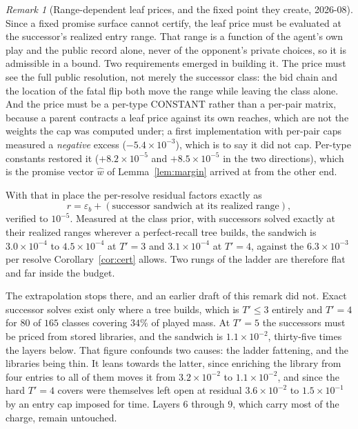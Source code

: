 \documentclass[11pt]{article}
\theoremstyle{plain}
\theoremstyle{definition}
\theoremstyle{remark}
\newtheorem{remark}[theorem]{Remark}
\begin{document}
\begin{remark}[Range-dependent leaf prices, and the fixed point they
create, 2026-08]\label{rem:fixedpoint}
Since a fixed promise surface cannot certify, the leaf price must be
evaluated at the successor's realized entry range. That range is a
function of the agent's own play and the public record alone, never of
the opponent's private choices, so it is admissible in a bound. Two
requirements emerged in building it. The price must see the full public
resolution, not merely the successor class: the bid chain and the
location of the fatal flip both move the range while leaving the class
alone. And the price must be a per-type CONSTANT rather than a per-pair
matrix, because a parent contracts a leaf price against its own reaches,
which are not the weights the cap was computed under; a first
implementation with per-pair caps measured a \emph{negative} excess
($-5.4\times10^{-3}$), which is to say it did not cap. Per-type
constants restored it ($+8.2\times10^{-5}$ and $+8.5\times10^{-5}$ in
the two directions), which is the promise vector $\hat w$ of
Lemma~\ref{lem:margin} arrived at from the other end.

With that in place the per-resolve residual factors exactly as
\[
  r = \varepsilon_b + (\text{successor sandwich at its realized range}),
\]
verified to $10^{-5}$. Measured at the class prior, with successors
solved exactly at their realized ranges wherever a perfect-recall tree
builds, the sandwich is $3.0\times10^{-4}$ to $4.5\times10^{-4}$ at
$T'{=}3$ and $3.1\times10^{-4}$ at $T'{=}4$, against the
$6.3\times10^{-3}$ per resolve Corollary~\ref{cor:cert} allows. Two
rungs of the ladder are therefore flat and far inside the budget.

The extrapolation stops there, and an earlier draft of this remark did
not. Exact successor solves exist only where a tree builds, which is
$T'\le3$ entirely and $T'{=}4$ for $80$ of $165$ classes covering $34\%$
of played mass. At $T'{=}5$ the successors must be priced from stored
libraries, and the sandwich is $1.1\times10^{-2}$, thirty-five times the
layers below. That figure confounds two causes: the ladder fattening, and
the libraries being thin. It leans towards the latter, since enriching
the library from four entries to all of them moves it from
$3.2\times10^{-2}$ to $1.1\times10^{-2}$, and since the hard $T'{=}4$
covers were themselves left open at residual $3.6\times10^{-2}$ to
$1.5\times10^{-1}$ by an entry cap imposed for time. Layers $6$ through
$9$, which carry most of the charge, remain untouched.


\end{remark}
\end{document}
